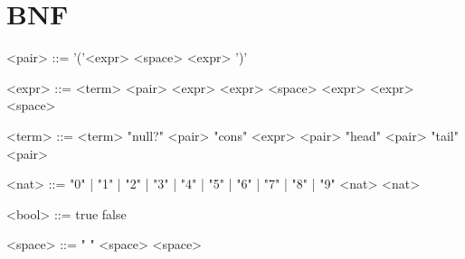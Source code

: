 \documentclass[]{article}
\date{May 05, 2017}
\begin{document}
  \section{BNF}
  \setlength{\grammarparsep}{20pt}
  \setlength{\grammarindent}{8em}
  \begin{grammar}
    
    <pair>    ::= '('<expr> <space> <expr> ')'

    <expr>    ::=  <term>
              \alt <pair>
              \alt <expr> <expr>
              \alt <space> <expr>
              \alt <expr> <space>

    <term>    ::=  <term>
              \alt "null?" <pair>
              \alt "cons"  <expr> <pair> 
              \alt "head"  <pair>
              \alt "tail"  <pair>

    <nat>     ::=  "0" | "1" | "2" | "3" | "4" | "5" | "6" | "7" | "8" | "9" 
              \alt <nat> <nat>

    <bool>    ::=  true 
              \alt false 

    <space>   ::=  " "
              \alt <space> <space>
  \end{grammar}
\end{document}
